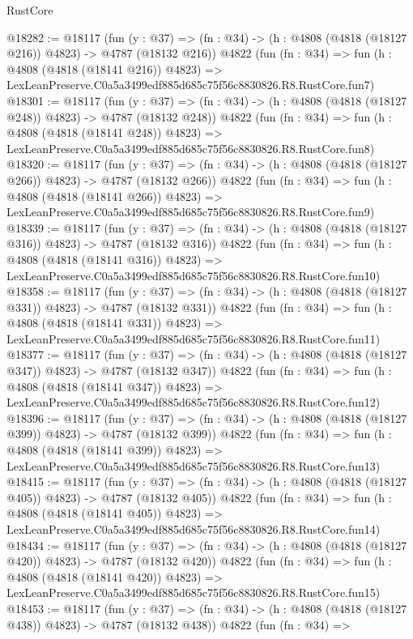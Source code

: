 \begin{lexlean}{RustCore}
\begin{coremodule}
@18282 := @18117
    (fun (y : @37) => (fn : @34) -> (h : @4808 (@4818 (@18127 @216)) @4823) -> @4787 (@18132 @216))
    @4822
    (fun (fn : @34) =>
    fun (h : @4808 (@4818 (@18141 @216)) @4823) =>
    LexLeanPreserve.C0a5a3499edf885d685c75f56c8830826.R8.RustCore.fun7)
@18301 := @18117
    (fun (y : @37) => (fn : @34) -> (h : @4808 (@4818 (@18127 @248)) @4823) -> @4787 (@18132 @248))
    @4822
    (fun (fn : @34) =>
    fun (h : @4808 (@4818 (@18141 @248)) @4823) =>
    LexLeanPreserve.C0a5a3499edf885d685c75f56c8830826.R8.RustCore.fun8)
@18320 := @18117
    (fun (y : @37) => (fn : @34) -> (h : @4808 (@4818 (@18127 @266)) @4823) -> @4787 (@18132 @266))
    @4822
    (fun (fn : @34) =>
    fun (h : @4808 (@4818 (@18141 @266)) @4823) =>
    LexLeanPreserve.C0a5a3499edf885d685c75f56c8830826.R8.RustCore.fun9)
@18339 := @18117
    (fun (y : @37) => (fn : @34) -> (h : @4808 (@4818 (@18127 @316)) @4823) -> @4787 (@18132 @316))
    @4822
    (fun (fn : @34) =>
    fun (h : @4808 (@4818 (@18141 @316)) @4823) =>
    LexLeanPreserve.C0a5a3499edf885d685c75f56c8830826.R8.RustCore.fun10)
@18358 := @18117
    (fun (y : @37) => (fn : @34) -> (h : @4808 (@4818 (@18127 @331)) @4823) -> @4787 (@18132 @331))
    @4822
    (fun (fn : @34) =>
    fun (h : @4808 (@4818 (@18141 @331)) @4823) =>
    LexLeanPreserve.C0a5a3499edf885d685c75f56c8830826.R8.RustCore.fun11)
@18377 := @18117
    (fun (y : @37) => (fn : @34) -> (h : @4808 (@4818 (@18127 @347)) @4823) -> @4787 (@18132 @347))
    @4822
    (fun (fn : @34) =>
    fun (h : @4808 (@4818 (@18141 @347)) @4823) =>
    LexLeanPreserve.C0a5a3499edf885d685c75f56c8830826.R8.RustCore.fun12)
@18396 := @18117
    (fun (y : @37) => (fn : @34) -> (h : @4808 (@4818 (@18127 @399)) @4823) -> @4787 (@18132 @399))
    @4822
    (fun (fn : @34) =>
    fun (h : @4808 (@4818 (@18141 @399)) @4823) =>
    LexLeanPreserve.C0a5a3499edf885d685c75f56c8830826.R8.RustCore.fun13)
@18415 := @18117
    (fun (y : @37) => (fn : @34) -> (h : @4808 (@4818 (@18127 @405)) @4823) -> @4787 (@18132 @405))
    @4822
    (fun (fn : @34) =>
    fun (h : @4808 (@4818 (@18141 @405)) @4823) =>
    LexLeanPreserve.C0a5a3499edf885d685c75f56c8830826.R8.RustCore.fun14)
@18434 := @18117
    (fun (y : @37) => (fn : @34) -> (h : @4808 (@4818 (@18127 @420)) @4823) -> @4787 (@18132 @420))
    @4822
    (fun (fn : @34) =>
    fun (h : @4808 (@4818 (@18141 @420)) @4823) =>
    LexLeanPreserve.C0a5a3499edf885d685c75f56c8830826.R8.RustCore.fun15)
@18453 := @18117
    (fun (y : @37) => (fn : @34) -> (h : @4808 (@4818 (@18127 @438)) @4823) -> @4787 (@18132 @438))
    @4822
    (fun (fn : @34) =>

\end{coremodule}
\end{lexlean}
